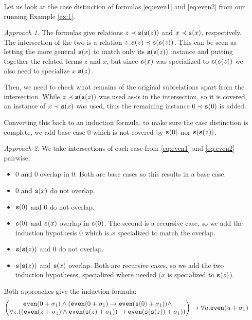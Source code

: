 \begin{example}
	Let us look at the case distinction of formulas \eqref{eq:even1} and \eqref{eq:even2} from our running Example \ref{ex:1}.

	\textit{Approach 1.} The formulas give relations $z\prec\mathtt{s}(\mathtt{s}(z))$ and $x\prec\mathtt{s}(x)$, respectively. The intersection of the two is a relation $z,\mathtt{s}(z)\prec\mathtt{s}(\mathtt{s}(z))$. This can be seen as letting the more general $\mathtt{s}(x)$ to match only its $\mathtt{s}(\mathtt{s}(z))$ instance and putting together the related terms $z$ and $x$, but since $\mathtt{s}(x)$ was specialized to $\mathtt{s}(\mathtt{s}(z))$ we also need to specialize $x$ $\mathtt{s}(z)$.

	Then, we need to check what remains of the original subrelations apart from the intersection. While $z\prec\mathtt{s}(\mathtt{s}(z))$ was used as-is in the intersection, so it is covered, an instance of $x\prec\mathtt{s}(x)$ was used, thus the remaining instance $0\prec\mathtt{s}(0)$ is added.

	Converting this back to an induction formula, to make sure the case distinction is complete, we add base case 0 which is not covered by $\mathtt{s}(0)$ nor $\mathtt{s}(\mathtt{s}(z))$.

	\textit{Approach 2.} We take intersections of each case from \eqref{eq:even1} and \eqref{eq:even2} pairwise:
	\begin{itemize}
		\item $0$ and $0$ overlap in $0$. Both are base cases so this results in a base case.
		\item $0$ and $\mathtt{s}(x)$ do not overlap.
		\item $\mathtt{s}(0)$ and $0$ do not overlap.
		\item $\mathtt{s}(0)$ and $\mathtt{s}(x)$ overlap in $\mathtt{s}(0)$. The second is a recursive case, so we add the induction hypothesis $0$ which is $x$ specialized to match the overlap.
		\item $\mathtt{s}(\mathtt{s}(z))$ and $0$ do not overlap.
		\item $\mathtt{s}(\mathtt{s}(z))$ and $\mathtt{s}(x)$ overlap. Both are recursive cases, so we add the two induction hypotheses, specialized where needed ($x$ is specialized to $\mathtt{s}(z)$).
	\end{itemize}

	Both approaches give the induction formula:
	\begin{equation}\label{eq:even}\begin{pmatrix}\mathtt{even}(0+\sigma_1)\land(\mathtt{even}(0+\sigma_1)\rightarrow\mathtt{even}(\mathtt{s}(0)+\sigma_1))\land\\
	\forall z.((\mathtt{even}(z+\sigma_1)\land\mathtt{even}(\mathtt{s}(z)+\sigma_1))\rightarrow\mathtt{even}(\mathtt{s}(\mathtt{s}(z))+\sigma_1))\end{pmatrix}\rightarrow \forall u.\mathtt{even}(u+\sigma_1)\end{equation}
\end{example}

